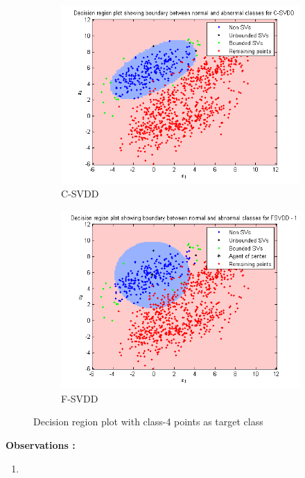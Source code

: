 \documentclass{article} %
\begin{document}
\begin{figure}
\begin{subfigure}{.5\textwidth}
  \centering
  \includegraphics[width=\linewidth]{../Code/overlapping/svdd/decn_4}
\caption{C-SVDD} 
\end{subfigure}%
\begin{subfigure}{.5\textwidth}
  \centering
  \includegraphics[width=\linewidth]{../Code/overlapping/fsvdd/decn_4}
\caption{F-SVDD} 
\end{subfigure}
\caption{Decision region plot with class-4 points as target class} 
\end{figure}

\textbf{Observations :}
\begin{enumerate}
\item 
\end{enumerate}
\end{document}
